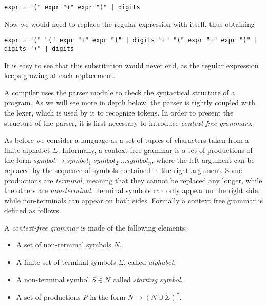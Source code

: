 \begin{lstlisting}
expr = "(" expr "+" expr ")" | digits
\end{lstlisting}

Now we would need to replace the regular expression with itself, thus obtaining

\begin{lstlisting}
expr = "(" "(" expr "+" expr ")" | digits "+" "(" expr "+" expr ")" | digits ")" | digits
\end{lstlisting}

\noindent
It is easy to see that this substitution would never end, as the regular expression keeps growing at each replacement.

A compiler uses the parser module to check the syntactical structure of a program. As we will see more in depth below, the parser is tightly coupled with the lexer, which is used by it to recognize tokens. In order to present the structure of the parser, it is first necessary to introduce \textit{context-free grammars}.

As before we consider a language as a set of tuples of characters taken from a finite alphabet $\Sigma$. Informally, a context-free grammar is a set of productions of the form $symbol \rightarrow symbol_{1} \; symbol_{2} \; ... symbol_{n}$, where the left argument can be replaced by the sequence of symbols contained in the right argument. Some productions are \textit{terminal}, meaning that they cannot be replaced any longer, while the others are \textit{non-terminal}. Terminal symbols can only appear on the right side, while non-terminals can appear on both sides. Formally a context free grammar is defined as follows

\begin{definition}
	\label{def:ch_background_grammar}
	A \textit{context-free grammar} is made of the following elements:
	
	\begin{itemize}[noitemsep]
		\item A set of non-terminal symbols $N$.
		\item A finite set of terminal symbols $\Sigma$, called \textit{alphabet}.
		\item A non-terminal symbol $S \in N$ called \textit{starting symbol}.
		\item A set of productions $P$ in the form $N \rightarrow (N \cup \Sigma)^{*}$.
	\end{itemize}
\end{definition}

